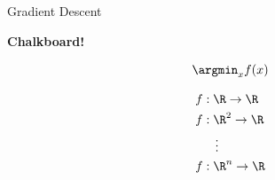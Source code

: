 \begin{frame}{Gradient Descent}

	\begin{center}
		\bfseries
		Chalkboard!

		\begin{equation*}
			\argmin_x f(x)
		\end{equation*}

		\begin{align*}
			f & : \R \to \R   \\
			f & : \R^2 \to \R \\
			  & \quad \vdots  \\
			f & : \R^n \to \R
		\end{align*}
	\end{center}

\end{frame}

